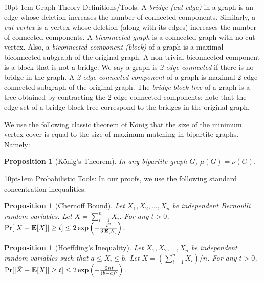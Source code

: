 \documentclass[letterpaper,11pt]{article}
\makeatletter
\DeclareMathOperator{\E}{\ensuremath{\normalfont \textbf{E}}}
\newtheorem{proposition}[theorem]{Proposition}
\renewcommand{\paragraph}{%
  \@startsection{paragraph}{4}%
  {\z@}{10pt}{-1em}%
  {\normalfont\normalsize\bfseries}%
}
\makeatother
\begin{document}
\paragraph{Graph Theory Definitions/Tools:} A {\em bridge (cut edge)} in a graph is an edge whose deletion increases the number of connected components. Similarly, a {\em cut vertex} is a vertex whose deletion (along with its edges)  increases the number of connected components. A {\em biconnected graph} is a connected graph with no cut vertex. Also, a {\em biconnected component (block)} of a graph is a maximal biconnected subgraph of the original graph. A non-trivial biconnected component is a block that is not a bridge. We say a graph is {\em 2-edge-connected} if there is no bridge in the graph. A {\em 2-edge-connected component} of a graph is maximal 2-edge-connected subgraph of the original graph. The {\em bridge-block tree} of a graph is a tree obtained by contracting the 2-edge-connected components; note that the edge set of a bridge-block tree correspond to the bridges in the original graph.


We use the following classic theorem of K\"{o}nig \cite{Konig1916} that the size of the minimum vertex cover is equal to the size of maximum matching in bipartite graphs. Namely:

\begin{proposition}[K\"{o}nig’s Theorem]\label{prop:konig}
    In any bipartite graph $G$,  $\mu(G) = \nu(G)$.
\end{proposition}


\paragraph{Probabilistic Tools:} In our proofs, we use the following standard concentration inequalities.

\begin{proposition}[Chernoff Bound]\label{prop:chernoff}
    Let $X_1, X_2, \ldots, X_n$ be independent Bernoulli random variables. Let $X = \sum_{i=1}^{n} X_i$. For any $t > 0$, 
    $\Pr[|X - \E[X]| \geq t] \leq 2\exp\left(-\frac{t^2}{3\E[X]}\right).$
\end{proposition}

\begin{proposition}[Hoeffding’s Inequality]\label{prop:hoeffding}
    Let $X_1, X_2, \ldots, X_n$ be independent random variables such that $a \leq X_i \leq b$. Let $\bar{X} = (\sum_{i=1}^n X_i)/n$. For any $t > 0$, 
    $
    \Pr[|\bar{X} - \E[X]| \geq t] \leq 2\exp\left(-\frac{2nt}{(b-a)^2}\right).
    $
\end{proposition}
\end{document}
